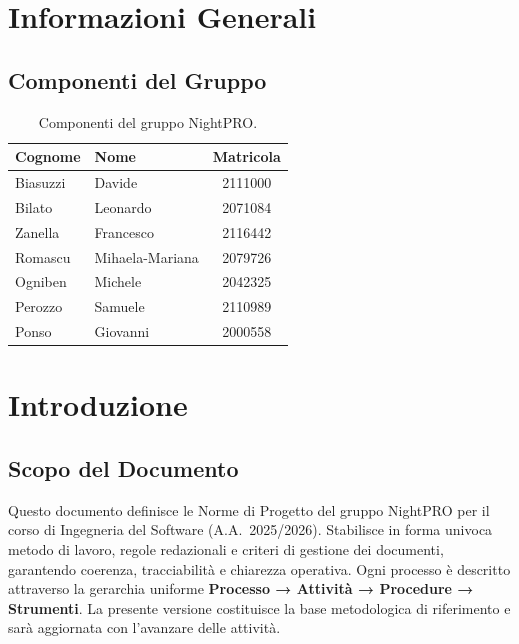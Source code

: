 \documentclass[a4paper, 11pt, oneside]{scrartcl}
\begin{document}
\newpage
\tableofcontents
\pagestyle{fancy}

\newpage
\section{Informazioni Generali}

\subsection{Componenti del Gruppo}

\begin{table}[h!]
    \centering
    \renewcommand{\arraystretch}{1.2}
    \begin{tabular}{@{}llc@{}}
        \toprule
        \textbf{Cognome} & \textbf{Nome}   & \textbf{Matricola} \\
        \midrule
        Biasuzzi         & Davide          & 2111000            \\
        Bilato           & Leonardo        & 2071084            \\
        Zanella          & Francesco       & 2116442            \\
        Romascu          & Mihaela-Mariana & 2079726            \\
        Ogniben          & Michele         & 2042325            \\
        Perozzo          & Samuele         & 2110989            \\
        Ponso            & Giovanni        & 2000558            \\
        \bottomrule
    \end{tabular}
    \caption{Componenti del gruppo NightPRO.}
\end{table}

\newpage
\section{Introduzione}
\label{sec:introduzione}

\subsection{Scopo del Documento}
Questo documento definisce le Norme di Progetto{\scriptsize{}} del gruppo NightPRO per il corso di Ingegneria del Software (A.A.~2025/2026).
Stabilisce in forma univoca metodo di lavoro, regole redazionali e criteri di gestione dei documenti, garantendo coerenza, tracciabilità e chiarezza operativa.
Ogni processo è descritto attraverso la gerarchia uniforme \textbf{Processo → Attività → Procedure → Strumenti}.
La presente versione costituisce la base metodologica di riferimento e sarà aggiornata con l'avanzare delle attività.
\end{document}
